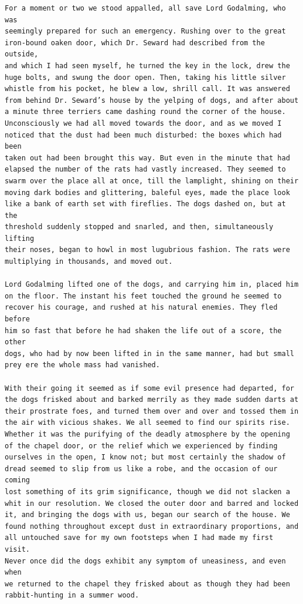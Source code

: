 \documentclass{article}
\begin{document}
\begin{verbatim}
For a moment or two we stood appalled, all save Lord Godalming, who was
seemingly prepared for such an emergency. Rushing over to the great
iron-bound oaken door, which Dr. Seward had described from the outside,
and which I had seen myself, he turned the key in the lock, drew the
huge bolts, and swung the door open. Then, taking his little silver
whistle from his pocket, he blew a low, shrill call. It was answered
from behind Dr. Seward’s house by the yelping of dogs, and after about
a minute three terriers came dashing round the corner of the house.
Unconsciously we had all moved towards the door, and as we moved I
noticed that the dust had been much disturbed: the boxes which had been
taken out had been brought this way. But even in the minute that had
elapsed the number of the rats had vastly increased. They seemed to
swarm over the place all at once, till the lamplight, shining on their
moving dark bodies and glittering, baleful eyes, made the place look
like a bank of earth set with fireflies. The dogs dashed on, but at the
threshold suddenly stopped and snarled, and then, simultaneously lifting
their noses, began to howl in most lugubrious fashion. The rats were
multiplying in thousands, and moved out.

Lord Godalming lifted one of the dogs, and carrying him in, placed him
on the floor. The instant his feet touched the ground he seemed to
recover his courage, and rushed at his natural enemies. They fled before
him so fast that before he had shaken the life out of a score, the other
dogs, who had by now been lifted in in the same manner, had but small
prey ere the whole mass had vanished.

With their going it seemed as if some evil presence had departed, for
the dogs frisked about and barked merrily as they made sudden darts at
their prostrate foes, and turned them over and over and tossed them in
the air with vicious shakes. We all seemed to find our spirits rise.
Whether it was the purifying of the deadly atmosphere by the opening
of the chapel door, or the relief which we experienced by finding
ourselves in the open, I know not; but most certainly the shadow of
dread seemed to slip from us like a robe, and the occasion of our coming
lost something of its grim significance, though we did not slacken a
whit in our resolution. We closed the outer door and barred and locked
it, and bringing the dogs with us, began our search of the house. We
found nothing throughout except dust in extraordinary proportions, and
all untouched save for my own footsteps when I had made my first visit.
Never once did the dogs exhibit any symptom of uneasiness, and even when
we returned to the chapel they frisked about as though they had been
rabbit-hunting in a summer wood.


\end{verbatim}
\end{document}
